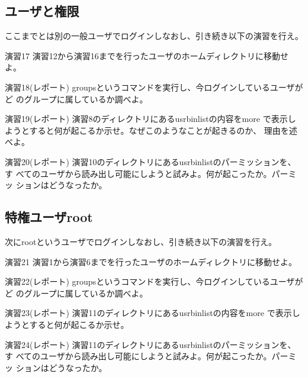 \documentclass[a4j,10pt]{jarticle}
\begin{document}
\subsection{ユーザと権限}
ここまでとは別の一般ユーザでログインしなおし、引き続き以下の演習を行え。
\begin{itembox}{演習17}
 演習12から演習16までを行ったユーザのホームディレクトリに移動せよ。
\end{itembox}
\begin{itembox}{演習18(レポート)}
 {\sffamily groups}というコマンドを実行し、今ログインしているユーザがど
 のグループに属しているか調べよ。
\end{itembox}
\begin{itembox}{演習19(レポート)}
 演習8のディレクトリにある{\sffamily usrbinlist}の内容を{\sffamily more} 
 で表示しようとすると何が起こるか示せ。なぜこのようなことが起きるのか、
 理由を述べよ。
\end{itembox}
\begin{itembox}{演習20(レポート)}
 演習10のディレクトリにある{\sffamily usrbinlist}のパーミッションを、す
 べてのユーザから読み出し可能にしようと試みよ。何が起こったか。パーミッ
 ションはどうなったか。
\end{itembox}

\subsection{特権ユーザroot}
次にrootというユーザでログインしなおし、引き続き以下の演習を行え。
\begin{itembox}{演習21}
 演習1から演習6までを行ったユーザのホームディレクトリに移動せよ。
\end{itembox}
\begin{itembox}{演習22(レポート)}
 {\sffamily groups}というコマンドを実行し、今ログインしているユーザがど
 のグループに属しているか調べよ。
\end{itembox}
\begin{itembox}{演習23(レポート)}
 演習11のディレクトリにある{\sffamily usrbinlist}の内容を{\sffamily more} 
 で表示しようとすると何が起こるか示せ。
\end{itembox}
\begin{itembox}{演習24(レポート)}
 演習11のディレクトリにある{\sffamily usrbinlist}のパーミッションを、す
 べてのユーザから読み出し可能にしようと試みよ。何が起こったか。パーミッ
 ションはどうなったか。
\end{itembox}
\end{document}
